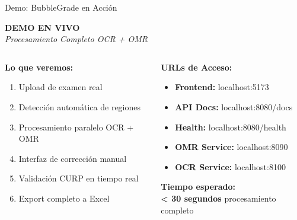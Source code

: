 \documentclass[aspectratio=169,11pt]{beamer}
\begin{document}
\begin{frame}{Demo: BubbleGrade en Acción}
    \begin{center}
        \textbf{\huge \textcolor{jazzblue}{DEMO EN VIVO}}\\
        \large \textit{Procesamiento Completo OCR + OMR}
    \end{center}
    
    \vspace{1cm}
    
    \begin{columns}
        \begin{column}{0.5\textwidth}
            \textbf{\textcolor{jazzgreen}{Lo que veremos:}}
            \begin{enumerate}
                \item Upload de examen real
                \item Detección automática de regiones
                \item Procesamiento paralelo OCR + OMR
                \item Interfaz de corrección manual
                \item Validación CURP en tiempo real
                \item Export completo a Excel
            \end{enumerate}
        \end{column}
        \begin{column}{0.5\textwidth}
            \textbf{\textcolor{jazzblue}{URLs de Acceso:}}
            \begin{itemize}
                \item \textbf{Frontend:} localhost:5173
                \item \textbf{API Docs:} localhost:8080/docs
                \item \textbf{Health:} localhost:8080/health
                \item \textbf{OMR Service:} localhost:8090
                \item \textbf{OCR Service:} localhost:8100
            \end{itemize}
            
            \vspace{0.5cm}
            \textbf{\textcolor{jazzorange}{Tiempo esperado:}}\\
            \textbf{< 30 segundos} procesamiento completo
        \end{column}
    \end{columns}
    

\end{frame}
\end{document}
